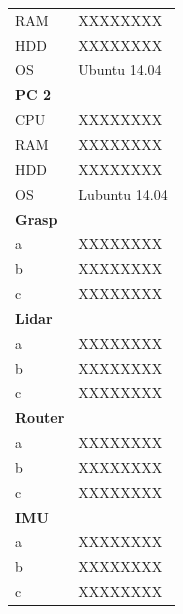 \begin{figure}[htbp]
\begin{minipage}{0.45\textwidth}
\begin{tabular}{ | p{2cm} | p{3cm} | }
			RAM & XXXXXXXX \\
			HDD & XXXXXXXX \\
			OS & Ubuntu 14.04 \\
			\hline \hline
			\bfseries{PC 2} &  \\
			\hline
			CPU & XXXXXXXX \\
			RAM & XXXXXXXX \\
			HDD & XXXXXXXX \\
			OS & Lubuntu 14.04 \\
			\hline \hline
			\bfseries{Grasp} &  \\
			\hline
			a & XXXXXXXX \\
			b & XXXXXXXX \\
			c & XXXXXXXX \\
			\hline \hline
			\bfseries{Lidar} &  \\
			\hline
			a & XXXXXXXX \\
			b & XXXXXXXX \\
			c & XXXXXXXX \\
			\hline \hline
			\bfseries{Router} &  \\
			\hline
			a & XXXXXXXX \\
			b & XXXXXXXX \\
			c & XXXXXXXX \\
			\hline \hline
			\bfseries{IMU} &  \\
			\hline
			a & XXXXXXXX \\
			b & XXXXXXXX \\
			c & XXXXXXXX \\
			\hline
		\end{tabular}
		\label{tab:hw}
	\end{minipage}
\end{figure}

\setcounter{figure}{1}

